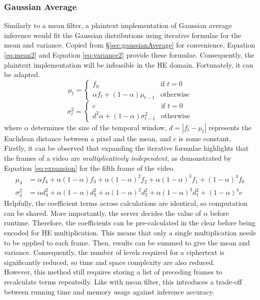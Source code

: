 \subsubsection{Gaussian Average}
\setlength{\leftskip}{0.5cm}
\indent \indent
Similarly to a mean filter, a plaintext implementation of Gaussian average inference would fit the Gaussian distributions using iterative formulae for the mean and variance. Copied from §\ref{sec:gaussianAverage} for convenience, Equation \ref{eq:mean2} and Equation \ref{eq:variance2} provide these formulae. Consequently, the plaintext implementation will be infeasible in the HE domain. Fortunately, it can be adapted.
\begin{equation}
    \label{eq:mean2}
    \mu_t =
    \begin{cases}
        f_0 & \text{if $t = 0$} \\
        \alpha f_t + (1 - \alpha) \mu_{t-1} & \text{otherwise}
    \end{cases}
\end{equation}
\begin{equation}
    \label{eq:variance2}
    \sigma^2_t =
    \begin{cases}
        c & \text{if $t = 0$} \\
        d^2 \alpha + (1 - \alpha) \sigma^2_{t-1} & \text{otherwise}
    \end{cases}
\end{equation}
where $\alpha$ determines the size of the temporal window, $d = |f_t - \mu_t|$ represents the Euclidean distance between a pixel and the mean, and $c$ is some constant.
\smallskip \\ \indent
Firstly, it can be observed that expanding the iterative formulae highlights that the frames of a video are \textit{multiplicatively independent}, as demonstrated by Equation \ref{eq:expansion} for the fifth frame of the video.
\begin{equation}
    \label{eq:expansion}
    \begin{split}
        \mu_4 &= \alpha f_4 + \alpha (1-\alpha) f_3 + \alpha (1-\alpha)^2 f_2 + \alpha (1-\alpha)^3 f_1 + (1-\alpha)^4 f_0 \\ 
        \sigma^2_4 &= \alpha d^2_4 + \alpha (1-\alpha) d^2_3  + \alpha (1-\alpha)^2 d^2_2 + \alpha (1-\alpha)^3 d^2_1 + (1-\alpha)^4 c
    \end{split}
\end{equation}
\indent
Helpfully, the coefficient terms across calculations are identical, so computation can be shared. More importantly, the server decides the value of $\alpha$ before runtime. Therefore, the coefficients can be pre-calculated in the clear before being encoded for HE multiplication. This means that only a single multiplication needs to be applied to each frame. Then, results can be summed to give the mean and variance. Consequently, the number of levels required for a ciphertext is significantly reduced, so time and space complexity are also reduced.
\smallskip \\ \indent
However, this method still requires storing a list of preceding frames to recalculate terms repeatedly. Like with mean filter, this introduces a trade-off between running time and memory usage against inference accuracy.

